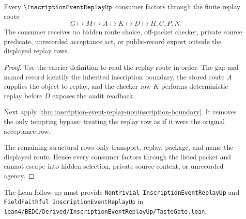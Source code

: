 \begin{theorem}
\label{thm:inscription-event-replay-consumer-nonescape}
Every $\InscriptionEventReplayUp$ consumer factors through the finite replay route
$$
G \longmapsto M \longmapsto A \longmapsto K \longmapsto D \longmapsto H,C,P,N.
$$
The consumer receives no hidden route choice, off-packet checker, private source predicate, unrecorded acceptance act, or public-record export outside the displayed replay rows.
\end{theorem}
\begin{proof}
Use the carrier definition to read the replay route in order. The gap and named record identify the inherited inscription boundary, the stored route $A$ supplies the object to replay, and the checker row $K$ performs deterministic replay before $D$ exposes the audit readback.

Next apply \autoref{thm:inscription-event-replay-noninscription-boundary}. It removes the only tempting bypass: treating the replay row as if it were the original acceptance row.

The remaining structural rows only transport, replay, package, and name the displayed route. Hence every consumer factors through the listed packet and cannot escape into hidden selection, private source content, or unrecorded agency.
\end{proof}

The Lean follow-up must provide \texttt{Nontrivial InscriptionEventReplayUp} and \texttt{FieldFaithful InscriptionEventReplayUp} in \texttt{lean4/BEDC/Derived/InscriptionEventReplayUp/TasteGate.lean}.


\begin{closurestatus}{\InscriptionEventReplayUp}
  \theoryclosure{\seedClosure}
  \formalstatus{\unformalizedV}
\end{closurestatus}
